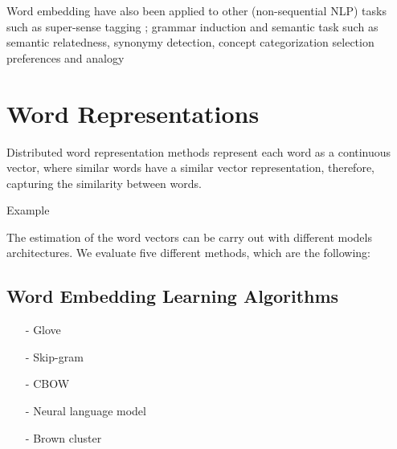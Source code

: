\documentclass[11pt]{article}
\begin{document}
Word embedding have also been applied to other (non-sequential NLP) tasks such as super-sense tagging \cite{Grave:2013}; grammar induction \cite{Spitkovsky:2011} and semantic task such as semantic relatedness, synonymy detection, concept categorization selection preferences and analogy \cite{baroni:2014}






\section{Word Representations}


Distributed word representation methods represent each word as a continuous vector, where similar words have a similar vector representation, therefore, capturing
the similarity between words.

Example

The estimation of the word vectors can be carry out with different models architectures. We evaluate five different methods, which are the following: 
 
\subsection{Word Embedding Learning Algorithms}
\begin{itemize}
\item[-] Glove \cite{pennington2014glove}
\item[-] Skip-gram \cite{Mikolov13}
\item[-] CBOW \cite{Mikolov13}
\item[-] Neural language model \cite{turian2010word}
\item[-] Brown cluster \cite{Brown92class-basedn-gram}
\end{itemize}
\end{document}
